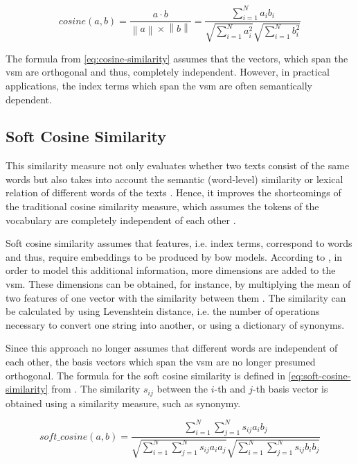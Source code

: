 \begin{equation}
    cosine(a,b) = \frac{a \cdot b}{\left\| a \right\| \times \left\| b \right\|} = \frac{\sum_{i=1}^{N}a_{i}b_{i}}{\sqrt{\sum_{i=1}^{N}{a}^2_{i}}\sqrt{\sum_{i=1}^{N}{b}^2_{i}}}
    \label{eq:cosine-similarity}
\end{equation}

The formula from \autoref{eq:cosine-similarity} assumes that the vectors, which span the \ac{vsm} are orthogonal and thus, 
completely independent.
However, in practical applications, the index terms which span the \ac{vsm} are often semantically dependent.


\subsection{Soft Cosine Similarity}\label{subsec:soft-cosine-similarity}

This similarity measure not only evaluates whether two texts consist of the same words but 
also takes into account the semantic (word-level) similarity or lexical relation of different words of the texts \cite{soft_cosine2017}.
Hence, it improves the shortcomings of the traditional cosine similarity measure, 
which assumes the tokens of the vocabulary are completely independent of each other \cite{soft_cosine2014}.

Soft cosine similarity assumes that features, i.e. index terms, correspond to words and thus, 
require embeddings to be produced by \ac{bow} models. 
According to \citeauthor{soft_cosine2014}, in order to model this additional information, more dimensions are added to the \ac{vsm}.
These dimensions can be obtained, for instance, by multiplying the mean of two features of one vector with the similarity between them \cite{soft_cosine2014}.
The similarity can be calculated by using Levenshtein distance, i.e. the number of operations necessary to convert one string into another, 
or using a dictionary of synonyms.

Since this approach no longer assumes that different words are independent of each other, 
the basis vectors which span the \ac{vsm} are no longer presumed orthogonal.
The formula for the soft cosine similarity is defined in \autoref{eq:soft-cosine-similarity} from \cite{soft_cosine2014}.
The similarity $s_{ij}$ between the $i$-th and $j$-th basis vector is obtained using a similarity measure, such as synonymy.

\begin{equation}
    soft\_cosine(a,b) = \frac{\sum_{i=1}^{N}\sum_{j=1}^{N}s_{ij}a_{i}b_{j}}{\sqrt{\sum_{i=1}^{N}\sum_{j=1}^{N}s_{ij}a_{i}a_{j}}\sqrt{\sum_{i=1}^{N}\sum_{j=1}^{N}s_{ij}b_{i}b_{j}}}
    \label{eq:soft-cosine-similarity}
\end{equation}

